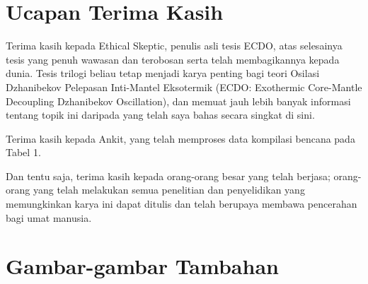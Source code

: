 \documentclass[10pt,twocolumn,letterpaper]{article}
\begin{document}
\section{Ucapan Terima Kasih}

Terima kasih kepada Ethical Skeptic, penulis asli tesis ECDO, atas selesainya tesis yang penuh wawasan dan terobosan serta telah membagikannya kepada dunia. Tesis trilogi beliau \cite{1} tetap menjadi karya penting bagi teori Osilasi Dzhanibekov Pelepasan Inti-Mantel Eksotermik (ECDO: Exothermic Core-Mantle Decoupling Dzhanibekov Oscillation), dan memuat jauh lebih banyak informasi tentang topik ini daripada yang telah saya bahas secara singkat di sini.

Terima kasih kepada Ankit, yang telah memproses data kompilasi bencana pada Tabel 1.

Dan tentu saja, terima kasih kepada orang-orang besar yang telah berjasa; orang-orang yang telah melakukan semua penelitian dan penyelidikan yang memungkinkan karya ini dapat ditulis dan telah berupaya membawa pencerahan bagi umat manusia.

\clearpage
\twocolumn

\section{Gambar-gambar Tambahan}
\end{document}

